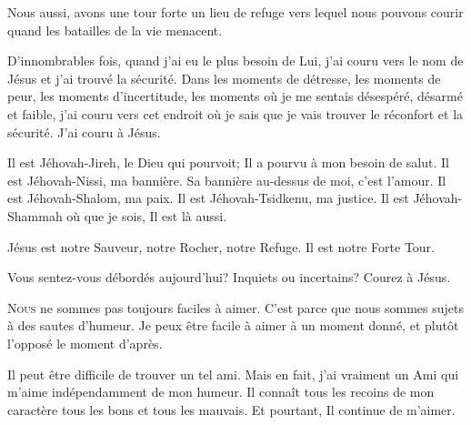Nous aussi, avons une tour forte \ocadr un lieu de refuge vers lequel
 nous pouvons courir quand les batailles de la vie menacent. 


D'innombrables fois, quand j'ai eu le plus besoin de Lui,
 j'ai couru vers le nom de Jésus et j'ai trouvé la sécurité.
 Dans les moments de détresse, les moments de peur,
 les moments d'incertitude, les moments où je me sentais désespéré,
 désarmé et faible, j'ai couru vers cet endroit où je sais
 que je vais trouver le réconfort et la sécurité. J'ai couru à Jésus. 

Il est Jéhovah-Jireh, le Dieu qui pourvoit; Il 
 a pourvu à mon besoin de salut. Il est Jéhovah-Nissi, ma bannière.
 Sa bannière au-dessus de moi, c'est l'amour. Il est Jéhovah-Shalom, 
 ma paix. Il est Jéhovah-Tsidkenu, ma justice. Il est Jéhovah-Shammah 
 \ocadr où que je sois, Il est là aussi. 

Jésus est notre Sauveur, notre Rocher, notre Refuge. Il est notre Forte Tour. 

Vous sentez-vous débordés aujourd'hui? Inquiets 
 ou incertains? Courez à Jésus. 

\dvrule







\lettrine{N}{ous} ne sommes pas toujours faciles à aimer.
 C'est parce que nous sommes sujets à des sautes d'humeur.
 Je peux être facile à aimer à un moment donné,
 et plutôt l'opposé le moment d'après.


Il peut être difficile de trouver un tel ami. Mais en fait,
 j'ai vraiment un Ami qui m'aime indépendamment de mon humeur.
 Il connaît tous les recoins de mon caractère
 \ocadr tous les bons et tous les mauvais.
 Et pourtant, Il continue de m'aimer.

